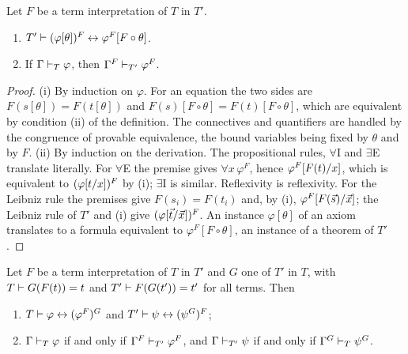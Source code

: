 \begin{lemma}
\label{base:lem:interp-sound}
Let $F$ be a term interpretation of $T$ in $T'$.
\begin{enumerate}[label=\textup{(\roman*)}]
\item $T'\vdash(\varphi[\theta])^{F}\leftrightarrow\varphi^{F}[F\circ\theta]$.
\item If $\Gamma\vdash_{T}\varphi$, then $\Gamma^{F}\vdash_{T'}\varphi^{F}$.
\end{enumerate}
\end{lemma}

\begin{proof}
(i) By induction on $\varphi$.  For an equation the two sides are
$F(s[\theta])=F(t[\theta])$ and $F(s)[F\circ\theta]=F(t)[F\circ\theta]$,
which are equivalent by condition (ii) of the definition.  The connectives
and quantifiers are handled by the congruence of provable equivalence, the
bound variables being fixed by $\theta$ and by $F$.
(ii) By induction on the derivation.  The propositional rules, $\forall$I
and $\exists$E translate literally.  For $\forall$E the premise gives
$\forall x\,\varphi^{F}$, hence $\varphi^{F}[F(t)/x]$, which is
equivalent to $(\varphi[t/x])^{F}$ by (i); $\exists$I is similar.
Reflexivity is reflexivity.  For the Leibniz rule the premises give
$F(s_i)=F(t_i)$ and, by (i), $\varphi^{F}[F(\vec s)/\vec x]$; the
Leibniz rule of $T'$ and (i) give $(\varphi[\vec t/\vec x])^{F}$.  An
instance $\varphi[\theta]$ of an axiom translates to a formula equivalent to
$\varphi^{F}[F\circ\theta]$, an instance of a theorem of $T'$.
\end{proof}

\begin{lemma}
\label{base:lem:faithful}
Let $F$ be a term interpretation of $T$ in $T'$ and $G$ one of $T'$ in $T$,
with $T\vdash G(F(t))=t$ and $T'\vdash F(G(t'))=t'$ for all terms.  Then
\begin{enumerate}[label=\textup{(\roman*)}]
\item $T\vdash\varphi\leftrightarrow(\varphi^{F})^{G}$ and
 $T'\vdash\psi\leftrightarrow(\psi^{G})^{F}$;
\item $\Gamma\vdash_{T}\varphi$ if and only if
 $\Gamma^{F}\vdash_{T'}\varphi^{F}$, and $\Gamma\vdash_{T'}\psi$ if and
 only if $\Gamma^{G}\vdash_{T}\psi^{G}$.
\end{enumerate}
\end{lemma}

